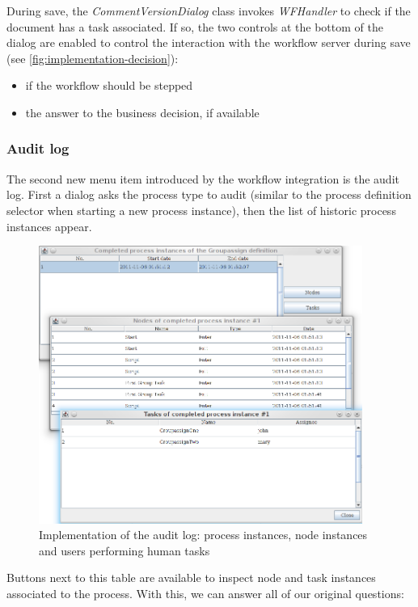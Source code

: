 During save, the \emph{CommentVersionDialog} class invokes \emph{WFHandler} to
check if the document has a task associated. If so, the two controls at the
bottom of the dialog are enabled to control the interaction with the workflow
server during save (see \autoref{fig:implementation-decision}):

\begin{itemize}
\item if the workflow should be stepped
\item the answer to the business decision, if available
\end{itemize}

\subsubsection*{Audit log}

The second new menu item introduced by the workflow integration is the audit
log. First a dialog asks the process type to audit (similar to the process
definition selector when starting a new process instance), then the list of
historic process instances appear.

\begin{figure}[H]
\centering
\includegraphics[width=400px,keepaspectratio]{implementation-auditlog.png}
\caption{Implementation of the audit log: process instances, node instances and users performing human tasks}
\label{fig:implementation-auditlog}
\end{figure}

Buttons next to this table are available to inspect node and task instances
associated to the process. With this, we can answer all of our original
questions:

